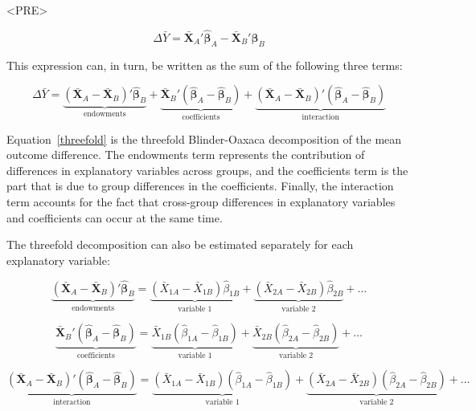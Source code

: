 <PRE>\documentclass[nojss]{jss}
\begin{document}
\begin{equation}\label{differential_2}
\Delta \bar{Y} = \boldsymbol{\bar{X}}_{A}'\boldsymbol{\hat{\beta}}_{A} - \boldsymbol{\bar{X}}_{B}'\boldsymbol{\hat{\beta}}_{B}
\end{equation}

This expression can, in turn, be written as the sum of the following three terms:

\begin{equation}\label{threefold}
\Delta \bar{Y} = \underbrace{(\boldsymbol{\bar{X}}_{A} - \boldsymbol{\bar{X}}_{B})'  \boldsymbol{\hat{\beta}}_{B}}_\text{endowments} + \underbrace{\boldsymbol{\bar{X}}_{B}' (\boldsymbol{\hat{\beta}}_{A} - \boldsymbol{\hat{\beta}}_{B})}_\text{coefficients} + \underbrace{(\boldsymbol{\bar{X}}_{A} - \boldsymbol{\bar{X}}_{B})' (\boldsymbol{\hat{\beta}}_{A} - \boldsymbol{\hat{\beta}}_{B})}_\text{interaction}
\end{equation}

Equation~\ref{threefold} is the threefold Blinder-Oaxaca decomposition of the mean outcome difference. The endowments term represents the contribution of differences in explanatory variables across groups, and the coefficients term is the part that is due to group differences in the coefficients. Finally, the interaction term accounts for the fact that cross-group differences in explanatory variables and coefficients can occur at the same time.

The threefold decomposition can also be estimated separately for each explanatory variable:

\begin{equation}\label{endowments}
\underbrace{(\boldsymbol{\bar{X}}_{A} - \boldsymbol{\bar{X}}_{B})'  \boldsymbol{\hat{\beta}}_{B}}_\text{endowments} = \underbrace{(\bar{X}_{1A} - \bar{X}_{1B})  \hat{\beta}_{1B}}_\text{variable 1} + \underbrace{(\bar{X}_{2A} - \bar{X}_{2B})  \hat{\beta}_{2B}}_\text{variable 2} + \dots
\end{equation}

\begin{equation}\label{coefficients}
\underbrace{\boldsymbol{\bar{X}}_{B}' (\boldsymbol{\hat{\beta}}_{A} - \boldsymbol{\hat{\beta}}_{B})}_\text{coefficients} = \underbrace{\bar{X}_{1B} (\hat{\beta}_{1A} - \hat{\beta}_{1B})}_\text{variable 1} + \underbrace{\bar{X}_{2B} (\hat{\beta}_{2A} - \hat{\beta}_{2B})}_\text{variable 2} + \dots
\end{equation}

\begin{equation}\label{interaction}
\underbrace{(\boldsymbol{\bar{X}}_{A} - \boldsymbol{\bar{X}}_{B})' (\boldsymbol{\hat{\beta}}_{A} - \boldsymbol{\hat{\beta}}_{B})}_\text{interaction} = \underbrace{(\bar{X}_{1A} - \bar{X}_{1B}) (\hat{\beta}_{1A} - \hat{\beta}_{1B})}_\text{variable 1} + \underbrace{(\bar{X}_{2A} - \bar{X}_{2B}) (\hat{\beta}_{2A} - \hat{\beta}_{2B})}_\text{variable 2} + \dots
\end{equation}
\end{document}
